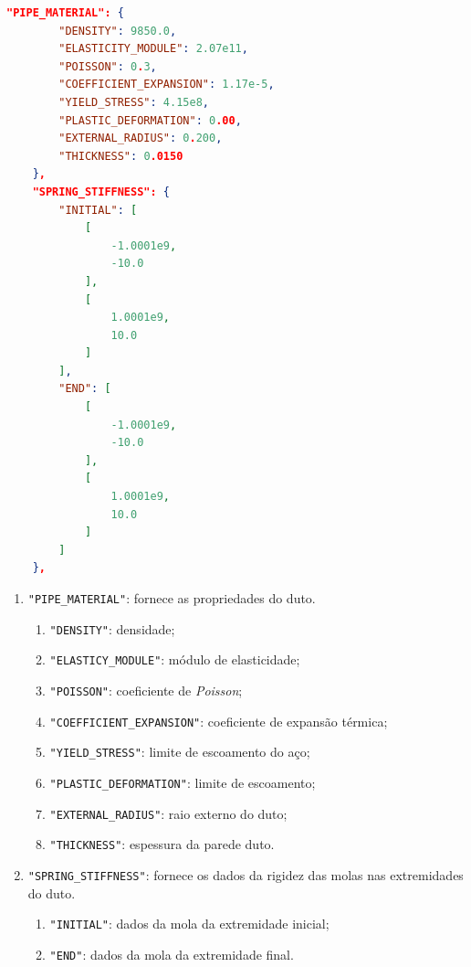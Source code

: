 \begin{lstlisting}[firstnumber=70, language=json, label={tab:jdsn-arquivojson3}, caption={Exemplo de arquivo de entrada de dados - Parte 3/7}]
    "PIPE_MATERIAL": {
        "DENSITY": 9850.0,
        "ELASTICITY_MODULE": 2.07e11,
        "POISSON": 0.3,
        "COEFFICIENT_EXPANSION": 1.17e-5,
        "YIELD_STRESS": 4.15e8,
        "PLASTIC_DEFORMATION": 0.00,
        "EXTERNAL_RADIUS": 0.200,
        "THICKNESS": 0.0150
    },
    "SPRING_STIFFNESS": {
        "INITIAL": [
            [
                -1.0001e9,
                -10.0
            ],
            [
                1.0001e9,
                10.0
            ]
        ],
        "END": [
            [
                -1.0001e9,
                -10.0
            ],
            [
                1.0001e9,
                10.0
            ]
        ]
    },
\end{lstlisting}

\begin{enumerate}
    \item \texttt{"PIPE\_MATERIAL"}: fornece as propriedades do duto.
    \begin{enumerate}
        \item \texttt{"DENSITY"}: densidade;
        \item \texttt{"ELASTICY\_MODULE"}: módulo de elasticidade;
        \item \texttt{"POISSON"}: coeficiente de \textit{Poisson};
        \item \texttt{"COEFFICIENT\_EXPANSION"}: coeficiente de expansão térmica;
        \item \texttt{"YIELD\_STRESS"}: limite de escoamento do aço;
        \item \texttt{"PLASTIC\_DEFORMATION"}: limite de escoamento;
        \item \texttt{"EXTERNAL\_RADIUS"}: raio externo do duto;
        \item \texttt{"THICKNESS"}: espessura da parede duto.
    \end{enumerate}
    \item \texttt{"SPRING\_STIFFNESS"}: fornece os dados da rigidez das molas nas extremidades do duto.
    \begin{enumerate}
        \item \texttt{"INITIAL"}: dados da mola da extremidade inicial;
        \item \texttt{"END"}: dados da mola da extremidade final.
    \end{enumerate}
\end{enumerate}

